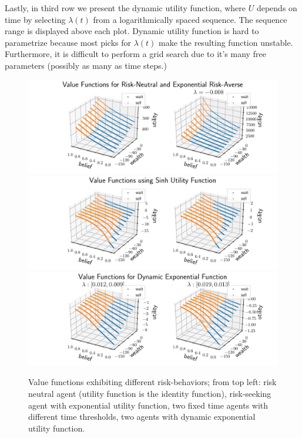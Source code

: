 Lastly, in third row we present the dynamic utility function, where $U$ depends on time by selecting $\lambda(t)$ from a logarithmically spaced sequence. The sequence range is displayed above each plot. Dynamic utility function is hard to parametrize because most picks for $\lambda(t)$ make the resulting function unstable. Furthermore, it is difficult to perform a grid search due to it's many free parameters (possibly as many as time steps.)

\begin{figure}[h]
    \centering
    \includegraphics[width=0.99\linewidth]{img/exp_policy.pdf}\\
    \includegraphics[width=0.99\linewidth]{img/sinh_policy.pdf}\\
    \includegraphics[width=0.99\linewidth]{img/dyn_policy.pdf}
    \caption{Value functions exhibiting different risk-behaviors; from top left: risk neutral agent (utility function is the identity function), risk-seeking agent with exponential utility function, two fixed time agents with different time thresholds, two agents with dynamic exponential utility function.}\label{fig:val-func}
\end{figure}


